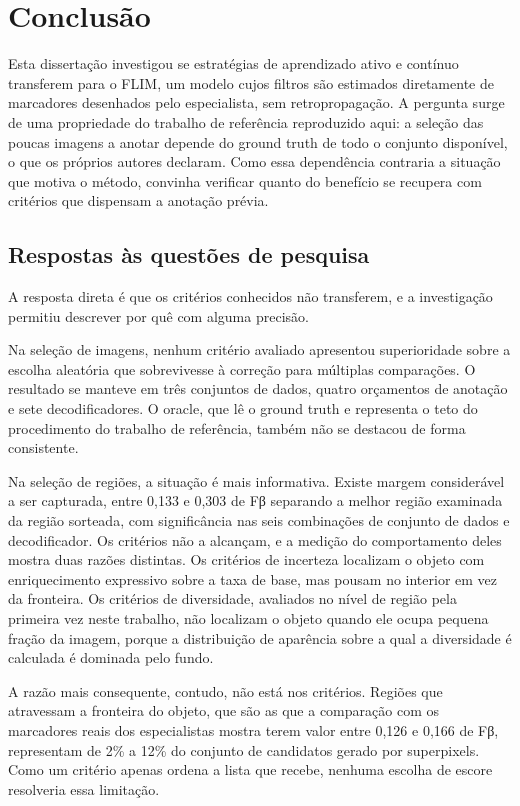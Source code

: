 \chapter{Conclusão}\label{cap_5}

Esta dissertação investigou se estratégias de aprendizado ativo e contínuo transferem para o \ac{FLIM}, um modelo cujos filtros são estimados diretamente de marcadores desenhados pelo especialista, sem retropropagação. A pergunta surge de uma propriedade do trabalho de referência reproduzido aqui: a seleção das poucas imagens a anotar depende do ground truth de todo o conjunto disponível, o que os próprios autores declaram. Como essa dependência contraria a situação que motiva o método, convinha verificar quanto do benefício se recupera com critérios que dispensam a anotação prévia.

\section{Respostas às questões de pesquisa}

A resposta direta é que os critérios conhecidos não transferem, e a investigação permitiu descrever por quê com alguma precisão.

Na seleção de imagens, nenhum critério avaliado apresentou superioridade sobre a escolha aleatória que sobrevivesse à correção para múltiplas comparações. O resultado se manteve em três conjuntos de dados, quatro orçamentos de anotação e sete decodificadores. O oracle, que lê o ground truth e representa o teto do procedimento do trabalho de referência, também não se destacou de forma consistente.

Na seleção de regiões, a situação é mais informativa. Existe margem considerável a ser capturada, entre 0,133 e 0,303 de Fβ separando a melhor região examinada da região sorteada, com significância nas seis combinações de conjunto de dados e decodificador. Os critérios não a alcançam, e a medição do comportamento deles mostra duas razões distintas. Os critérios de incerteza localizam o objeto com enriquecimento expressivo sobre a taxa de base, mas pousam no interior em vez da fronteira. Os critérios de diversidade, avaliados no nível de região pela primeira vez neste trabalho, não localizam o objeto quando ele ocupa pequena fração da imagem, porque a distribuição de aparência sobre a qual a diversidade é calculada é dominada pelo fundo.

A razão mais consequente, contudo, não está nos critérios. Regiões que atravessam a fronteira do objeto, que são as que a comparação com os marcadores reais dos especialistas mostra terem valor entre 0,126 e 0,166 de Fβ, representam de 2\% a 12\% do conjunto de candidatos gerado por superpixels. Como um critério apenas ordena a lista que recebe, nenhuma escolha de escore resolveria essa limitação.

